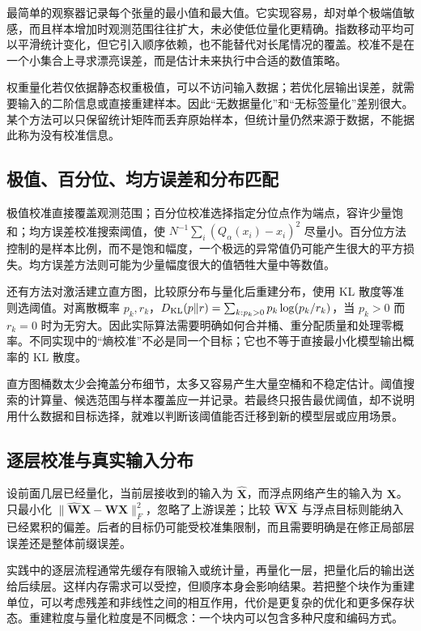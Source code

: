 \documentclass[UTF8,12pt,a4paper,fontset=fandol]{ctexart}
\begin{document}
最简单的观察器记录每个张量的最小值和最大值。它实现容易，却对单个极端值敏感，而且样本增加时观测范围往往扩大，未必使低位量化更精确。指数移动平均可以平滑统计变化，但它引入顺序依赖，也不能替代对长尾情况的覆盖。校准不是在一个小集合上寻求漂亮误差，而是估计未来执行中合适的数值策略。

权重量化若仅依据静态权重极值，可以不访问输入数据；若优化层输出误差，就需要输入的二阶信息或直接重建样本。因此“无数据量化”和“无标签量化”差别很大。某个方法可以只保留统计矩阵而丢弃原始样本，但统计量仍然来源于数据，不能据此称为没有校准信息。

\subsection{极值、百分位、均方误差和分布匹配}
极值校准直接覆盖观测范围；百分位校准选择指定分位点作为端点，容许少量饱和；均方误差校准搜索阈值，使 $N^{-1}\sum_i(Q_\alpha(x_i)-x_i)^2$ 尽量小。百分位方法控制的是样本比例，而不是饱和幅度，一个极远的异常值仍可能产生很大的平方损失。均方误差方法则可能为少量幅度很大的值牺牲大量中等数值。

还有方法对激活建立直方图，比较原分布与量化后重建分布，使用 KL 散度等准则选阈值。对离散概率 $p_k,r_k$，$D_{\rm KL}(p\|r)=\sum_{k:p_k>0}p_k\log(p_k/r_k)$，当 $p_k>0$ 而 $r_k=0$ 时为无穷大。因此实际算法需要明确如何合并桶、重分配质量和处理零概率。不同实现中的“熵校准”不必是同一个目标；它也不等于直接最小化模型输出概率的 KL 散度。

直方图桶数太少会掩盖分布细节，太多又容易产生大量空桶和不稳定估计。阈值搜索的计算量、候选范围与样本覆盖应一并记录。若最终只报告最优阈值，却不说明用什么数据和目标选择，就难以判断该阈值能否迁移到新的模型层或应用场景。

\subsection{逐层校准与真实输入分布}
设前面几层已经量化，当前层接收到的输入为 $\widehat{\mathbf X}$，而浮点网络产生的输入为 $\mathbf X$。只最小化 $\|\widehat{\mathbf W}\mathbf X-\mathbf W\mathbf X\|_F^2$，忽略了上游误差；比较 $\widehat{\mathbf W}\widehat{\mathbf X}$ 与浮点目标则能纳入已经累积的偏差。后者的目标仍可能受校准集限制，而且需要明确是在修正局部层误差还是整体前缀误差。

实践中的逐层流程通常先缓存有限输入或统计量，再量化一层，把量化后的输出送给后续层。这样内存需求可以受控，但顺序本身会影响结果。若把整个块作为重建单位，可以考虑残差和非线性之间的相互作用，代价是更复杂的优化和更多保存状态。重建粒度与量化粒度是不同概念：一个块内可以包含多种尺度和编码方式。
\end{document}
